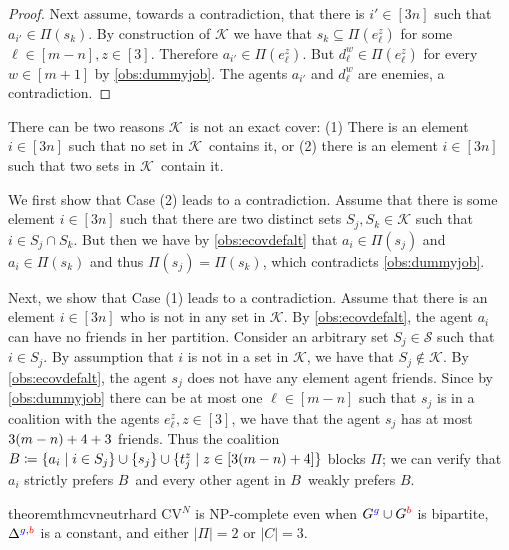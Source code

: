 \documentclass[a4paper,fleqn]{cas-sc}
\newcommand{\friendshipColor}{blue}
\newcommand{\enemyColor}{red}
\newcommand{\partition}{\ensuremath{\Pi}\xspace}
\newcommand{\coalition}{\ensuremath{C}\xspace}
\newcommand{\friendSuperscript}{{\color{\friendshipColor}g}}
\newcommand{\enemySuperscript}{{\color{\enemyColor}b}}
\newcommand{\friendshipGraph}{\ensuremath{G^{\friendSuperscript}}\xspace}
\newcommand{\enemyGraph}{\ensuremath{G^{\enemySuperscript}}\xspace}
\newcommand{\coalB}{\ensuremath{B}}
\newcommand{\CV}{CV\xspace}
\newcommand{\neut}[1]{#1\unskip$^{N}$}
\newcommand{\maxDegree}{\ensuremath{\Delta}}
\newcommand{\maxDegreeFE}{\ensuremath{\maxDegree^{\friendSuperscript,\enemySuperscript}}\xspace}
\newcommand{\maxCoalitionSize}{\ensuremath{|\coalition|}\xspace}
\newcommand{\maxNumberOfCoalitions}{\ensuremath{|\partition|}\xspace}
\newcommand{\appsymb}{$\star$}
\newcommand{\sets}{\ensuremath{\mathcal{S}}}
\newcommand{\elements}{\ensuremath{[3n]}}
\newcommand{\sset}[1]{\ensuremath{S_{#1}}}
\newcommand{\ecov}{\ensuremath{\mathcal{K}}}
\begin{document}
{\begin{proof}
Next assume, towards a contradiction, that there is $i' \in \elements$ such that $a_{i'} \in \partition(s_k)$. By construction of $\ecov$ we have that $s_k \subseteq \partition(e^z_\ell)$ for some $\ell \in [m -n], z \in [3]$.
Therefore $a_{i'} \in \partition(e^z_\ell)$.
But $d^w_\ell \in \partition(e^z_\ell)$ for every $w \in [m + 1]$ by \cref{obs:dummyjob}.
The agents $a_{i'}$ and $d^w_\ell$ are enemies, a contradiction.
\end{proof}


There can be two reasons \ecov\ is not an exact cover: (1) There is an element $i \in \elements$ such that no set in \ecov\ contains it, or (2) there is an element $i \in \elements$ such that two sets in \ecov\ contain it.

We first show that Case (2) leads to a contradiction.
Assume that there is some element $i \in \elements$ such that there are two distinct sets $\sset j, \sset k \in \ecov$ such that $i \in \sset j \cap \sset k$.
But then we have by \cref{obs:ecovdefalt} that $a_i \in \partition(s_j)$ and $a_i \in \partition(s_k)$ and thus $\partition(s_j) = \partition(s_k)$, which contradicts \cref{obs:dummyjob}.

Next, we show that Case (1) leads to a contradiction.
Assume that there is an element $i \in \elements$ who is not in any set in \ecov.
By \cref{obs:ecovdefalt}, the agent $a_i$ can have no friends in her partition.
Consider an arbitrary set $\sset j \in \sets$ such that $i \in \sset j$. By assumption that $i$ is not in a set in $\ecov$, we have that $\sset j \notin \ecov$.
By \cref{obs:ecovdefalt}, the agent $s_j$ does not have any element agent friends.
Since by \cref{obs:dummyjob} there can be at most one $\ell \in [m - n]$ such that $s_j$ is in a coalition with the agents $e^z_\ell, z \in [3]$, we have that the agent $s_j$ has at most $3(m -n) + 4 + 3$ friends.
Thus the coalition $\coalB \coloneqq \{a_i \mid i \in \sset j\} \cup \{s_j\} \cup \{t^z_j \mid z \in \dumcount\}$ blocks \partition; we can verify that $a_i$ strictly prefers \coalB\ and every other agent in \coalB\ weakly prefers \coalB.}



\begin{restatable}[\appsymb]{theorem}{thmcvneutrhard}
\neut{\CV} is NP-complete even when $\friendshipGraph \cup \enemyGraph$ is bipartite, $\maxDegreeFE$ is a constant, and either $\maxNumberOfCoalitions = 2$ or $\maxCoalitionSize = 3$.\label{thm:cvneutrhard}
\end{restatable}
\end{document}
